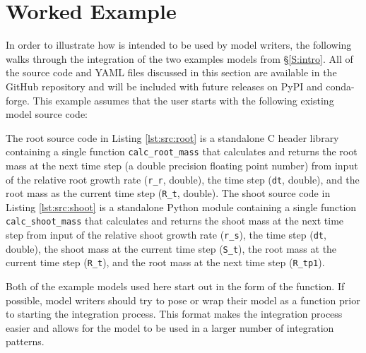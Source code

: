 \documentclass[journal]{IEEEtran}
\newcommand{\todo}[1]{{\color{red}{#1}}}
\newcommand{\pkg}{{\tt \todo{cis\_interface}}{}}
\newcommand{\rootsrc}{}
\newcommand{\shootsrc}{}
\begin{document}
\section{Worked Example}\label{S:example}
%
In order to illustrate how {\pkg} is intended to be used by model writers, the following walks through the integration of the two examples models from \S\ref{S:intro}. All of the source code and YAML files discussed in this section are available in the {\pkg} GitHub repository and will be included with future releases on PyPI and conda-forge. This example assumes that the user starts with the following existing model source code:
%
\rootsrc
%
\shootsrc
%
The root source code in Listing \ref{lst:src:root} is a standalone C header library containing a single function {\tt calc\_root\_mass} that calculates and returns the root mass at the next time step (a double precision floating point number) from input of the relative root growth rate ({\tt r\_r}, double), the time step ({\tt dt}, double), and the root mass as the current time step ({\tt R\_t}, double).
%
The shoot source code in Listing \ref{lst:src:shoot} is a standalone Python module containing a single function {\tt calc\_shoot\_mass} that calculates and returns the shoot mass at the next time step from input of the relative shoot growth rate ({\tt r\_s}), the time step ({\tt dt}, double), the shoot mass at the current time step ({\tt S\_t}), the root mass at the current time step ({\tt R\_t}), and the root mass at the next time step ({\tt R\_tp1}).

Both of the example models used here start out in the form of the function. If possible, model writers should try to pose or wrap their model as a function prior to starting the integration process. This format makes the integration process easier and allows for the model to be used in a larger number of integration patterns.

\end{document}
